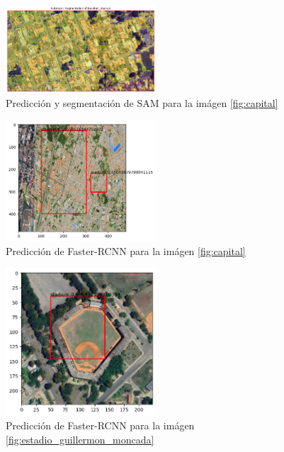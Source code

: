 \documentclass[article]{llncs}
\begin{document}
\begin{figure}[h]
    \centering
    \includegraphics[width=0.5\textwidth]{sam dos estadios.png}
    \caption{Predicci\'on y segmentación de SAM para la im\'agen \ref{fig:capital}}
    \label{fig:SAM2}
  \end{figure}

\begin{figure}[h]
    \centering
    \includegraphics[width=0.5\textwidth]{faster rcnn dos estadios.png}
    \caption{Predicci\'on de Faster-RCNN para la im\'agen \ref{fig:capital}}
    \label{fig:faster2}
  \end{figure}

\begin{figure}[h]
    \centering
    \includegraphics[width=0.5\textwidth]{fastergosu.png}
    \caption{Predicci\'on de Faster-RCNN para la im\'agen \ref{fig:estadio_guillermon_moncada}}
    \label{fig:Figure_1}
\end{figure}
\end{document}
